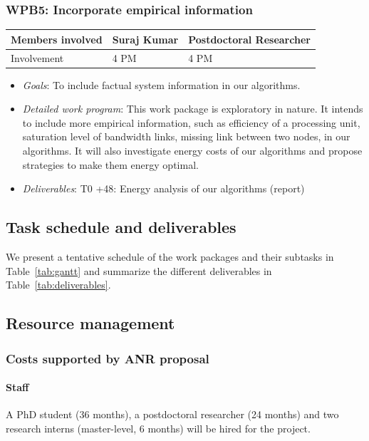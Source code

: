 \documentclass[a4paper,11pt]{article}
\newcommand{\subtask}[1]{{\color{orange}\paragraph{#1}$ $}}
\newcommand{\goal}{{\color{orange2}  \emph{Goals}:} }
\newcommand{\dwp}{{\color{orange2}  \emph{Detailed work program}: }}
\newcommand{\deliverables}{{\color{orange2}  \emph{Deliverables}: }}
\begin{document}
		\subsubsection{\textbf{WPB5}: Incorporate empirical information}
\vspace*{-0.385cm}\begin{table}[H]
	\begin{tabular}{lll}
		\hline
		\cellcolor{blue2}
		Members involved & Suraj Kumar & Postdoctoral Researcher \\
		\hline
		\cellcolor{orange2}
		Involvement      & 4 PM     & 4 PM \\
		\hline
	\end{tabular}
\end{table}\vspace*{-0.25cm}
\begin{itemize}[leftmargin=-1pt]
	\item[] \goal To include factual system information in our algorithms.
	\item[] \dwp This work package is exploratory in nature. It intends to include more empirical information, such as efficiency of a processing unit, saturation level of bandwidth links, missing link between two nodes, in our algorithms. It will also investigate energy costs of our algorithms and propose strategies to make them energy optimal.
	\item[] \deliverables T0 +48: Energy analysis of our algorithms (report) 
\end{itemize}



\subsection{Task schedule and deliverables}
\label{sec:org:taskschedule}
We present a tentative schedule of the work packages and their subtasks in Table~\ref{tab:gantt} and summarize the different deliverables in Table~\ref{tab:deliverables}.




\subsection{Resource management}
\label{sec:org:costs}
\subsubsection*{Costs supported by ANR proposal}
\paragraph{Staff} A PhD student (36 months), a postdoctoral researcher (24 months) and two research interns (master-level, 6 months) will be hired for the project. 
\end{document}
